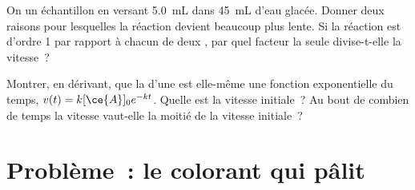 \begin{exercise}[$\star\star\star$]\label{exo:g12:reaction-rates:14}
On  un échantillon en versant \qty{5.0}{mL} dans \qty{45}{mL}
d'eau glacée. Donner deux raisons pour lesquelles la réaction devient
beaucoup plus lente. Si la réaction est d'ordre 1 par rapport à chacun
de deux , par quel facteur la seule  divise-t-elle la
vitesse~?
\end{exercise}

\begin{exercise}[$\star\star\star$]\label{exo:g12:reaction-rates:15}
Montrer, en dérivant, que la  d'une  est elle-même une fonction exponentielle du temps,
$v(t) = k[\ce{A}]_0 e^{-kt}$. Quelle est la vitesse initiale~? Au bout de
combien de temps la vitesse vaut-elle la moitié de la vitesse
initiale~?
\end{exercise}

\section{Problème~: le colorant qui pâlit}

